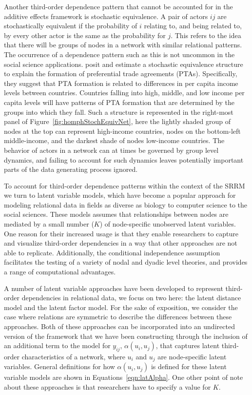 \documentclass[11pt,pdflatex]{elsarticle}
\begin{document}
Another third-order dependence pattern that cannot be accounted for in the additive effects framework is stochastic equivalence. A pair of actors $ij$ are stochastically equivalent if the probability of $i$ relating to, and being related to, by every other actor is the same as the probability for $j$. This refers to the idea that there will be groups of nodes in a network with similar relational patterns. The occurrence of a dependence pattern such as this is not uncommon in the social science applications. \citet{manger:etal:2012} posit and estimate a stochastic equivalence structure to explain the formation of preferential trade agreements (PTAs). Specifically, they suggest that PTA formation is related to differences in per capita income levels between countries. Countries falling into high, middle, and low income per capita levels will have patterns of PTA formation that are determined by the groups into which they fall. Such a structure is represented in the right-most panel of Figure~\ref{fig:homphStochEquivNet}, here the lightly shaded group of nodes at the top can represent high-income countries, nodes on the bottom-left middle-income, and the darkest shade of nodes low-income countries. The behavior of actors in a network can at times be governed by group level dynamics, and failing to account for such dynamics leaves potentially important parts of the data generating process ignored. 

To account for third-order dependence patterns within the context of the SRRM we turn to latent variable models, which have become a popular approach for modeling relational data in fields as diverse as biology to computer science to the social sciences. These models assumes that relationships between nodes are mediated by a small number ($K$) of node-specific unobserved latent variables. One reason for their increased usage is that they enable researchers to capture and visualize third-order dependencies in a way that other approaches are not able to replicate. Additionally, the conditional independence assumption facilitates the testing of a variety of nodal and dyadic level theories, and provides a range of computational advantages. 

A number of latent variable approaches have been developed to represent third-order dependencies in relational data, we focus on two here: the latent distance model and the latent factor model. For the sake of exposition, we consider the case where relations are symmetric to describe the differences between these approaches. Both of these approaches can be incorporated into an undirected version of the framework that we have been constructing through the inclusion of an additional term to the model for $y_{ij}$, $\alpha(u_{i}, u_{j})$, that captures latent third-order characteristics of a network, where $u_{i}$ and $u_{j}$ are node-specific latent variables. General definitions for how $\alpha(u_{i}, u_{j})$ is defined for these latent variable models are shown in Equations~\ref{eqn:latAlpha}. One other point of note about these approaches is that researchers have to specify a value for $K$. %
\end{document}

